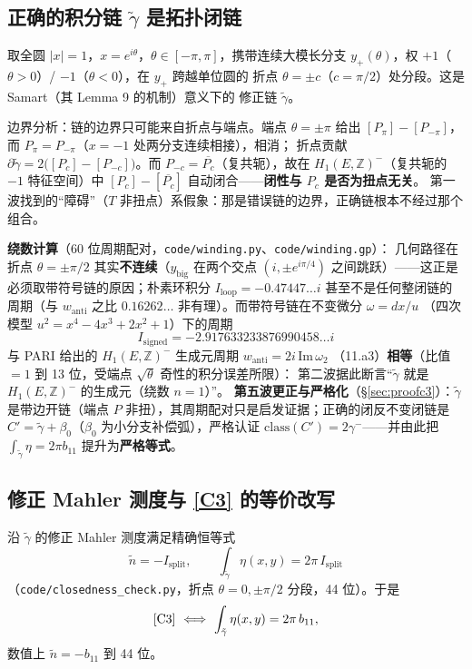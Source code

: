 \documentclass[11pt,a4paper]{ctexart}
\theoremstyle{remark}
\newcommand{\ZZ}{\mathbb{Z}}
\newcommand{\bN}{b_{11}}
\newcommand{\Isplit}{I_{\mathrm{split}}}
\begin{document}
\subsection{正确的积分链 $\tilde\gamma$ 是拓扑闭链}\label{sec:closed}

取全圆 $|x|=1$，$x=e^{i\theta}$，$\theta\in[-\pi,\pi]$，携带连续大模长分支
$y_+(\theta)$，权 $+1$（$\theta>0$）/ $-1$（$\theta<0$），在 $y_+$ 跨越单位圆的
折点 $\theta=\pm c$（$c=\pi/2$）处分段。这是 Samart（其 Lemma 9 的机制）意义下的
修正链 $\tilde\gamma$。

边界分析：链的边界只可能来自折点与端点。端点 $\theta=\pm\pi$ 给出
$[P_\pi]-[P_{-\pi}]$，而 $P_\pi=P_{-\pi}$（$x=-1$ 处两分支连续相接），相消；
折点贡献 $\partial\tilde\gamma=2\big([P_c]-[P_{-c}]\big)$。而
$P_{-c}=\overline{P_c}$（复共轭），故在 $H_1(E,\ZZ)^-$（复共轭的 $-1$ 特征空间）中
$[P_c]-[\overline{P_c}]$ 自动闭合——\textbf{闭性与 $P_c$ 是否为扭点无关}。
第一波找到的“障碍”（$T$ 非扭点）系假象：那是错误链的边界，正确链根本不经过那个组合。

\textbf{绕数计算}（60 位周期配对，\texttt{code/winding.py}、\texttt{code/winding.gp}）：
几何路径在折点 $\theta=\pm\pi/2$ 其实\textbf{不连续}（$y_{\mathrm{big}}$ 在两个交点
$(i,\pm e^{i\pi/4})$ 之间跳跃）——这正是必须取带符号链的原因；朴素环积分
$I_{\mathrm{loop}}=-0.47447\ldots i$ 甚至不是任何整闭链的周期（与 $w_{\mathrm{anti}}$
之比 $0.16262\ldots$ 非有理）。而带符号链在不变微分 $\omega=dx/u$
（四次模型 $u^2=x^4-4x^3+2x^2+1$）下的周期
\[
I_{\mathrm{signed}}=-2.917633233876990458\ldots i
\]
与 PARI 给出的 $H_1(E,\ZZ)^-$ 生成元周期 $w_{\mathrm{anti}}=2i\,\mathrm{Im}\,\omega_2$
（11.a3）\textbf{相等}（比值 $=1$ 到 13 位，受端点 $\sqrt\theta$ 奇性的积分误差所限）：
第二波据此断言``$\tilde\gamma$ 就是 $H_1(E,\ZZ)^-$ 的生成元（绕数 $n=1$）''。
\textbf{第五波更正与严格化}（\S\ref{sec:proofc3}）：$\tilde\gamma$ 是带边开链（端点
$P$ 非扭），其周期配对只是启发证据；正确的闭反不变闭链是
$C'=\tilde\gamma+\beta_0$（$\beta_0$ 为小分支补偿弧），严格认证
$\mathrm{class}(C')=2\gamma^-$——并由此把 $\int_{\tilde\gamma}\eta=2\pi\bN$
提升为\textbf{严格等式}。

\subsection{修正 Mahler 测度与 \eqref{C3} 的等价改写}

沿 $\tilde\gamma$ 的修正 Mahler 测度满足精确恒等式
\[
\tilde n=-\Isplit,\qquad \int_{\tilde\gamma}\eta(x,y)=2\pi\,\Isplit
\]
（\texttt{code/closedness\_check.py}，折点 $\theta=0,\pm\pi/2$ 分段，44 位）。于是
\[
\text{\eqref{C3}}\ \Longleftrightarrow\ \int_{\tilde\gamma}\eta(x,y)=2\pi\,\bN,
\]
数值上 $\tilde n=-\bN$ 到 44 位。
\end{document}
